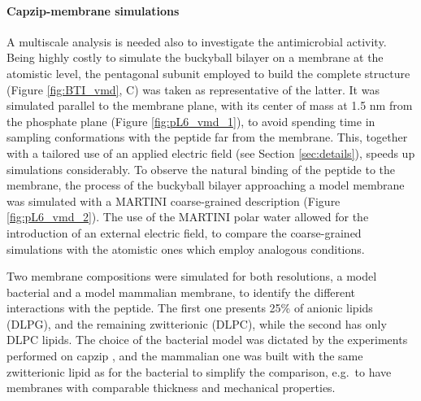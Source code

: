 \paragraph{Capzip-membrane simulations} A multiscale analysis is needed also to investigate the antimicrobial activity. Being highly costly to simulate the buckyball bilayer on a membrane at the atomistic level, the pentagonal subunit employed to build the complete structure (Figure \ref{fig:BTI_vmd}, C) was taken as representative of the latter. It was simulated parallel to the membrane plane, with its center of mass at 1.5 nm from the phosphate plane (Figure \ref{fig:pL6_vmd_1}), to avoid spending time in sampling conformations with the peptide far from the membrane. This, together with a tailored use of an applied electric field (see Section \ref{sec:details}), speeds up simulations considerably.
%
To observe the natural binding of the peptide to the membrane, the process of the buckyball bilayer approaching a model membrane was simulated with a MARTINI coarse-grained description (Figure \ref{fig:pL6_vmd_2}). The use of the MARTINI polar water \citep{Yesylevskyy2010} allowed for the introduction of an external electric field, to compare the coarse-grained simulations with the atomistic ones which employ analogous conditions.

Two membrane compositions were simulated for both resolutions, a model bacterial and a model mammalian membrane, to identify the different interactions with the peptide. The first one presents 25\% of anionic lipids (DLPG), and the remaining zwitterionic (DLPC), while the second has only DLPC lipids. The choice of the bacterial model was dictated by the experiments performed on capzip \citep{Castelletto2016}, and the mammalian one was built with the same zwitterionic lipid as for the bacterial to simplify the comparison, e.g.\ to have membranes with comparable thickness and mechanical properties.

